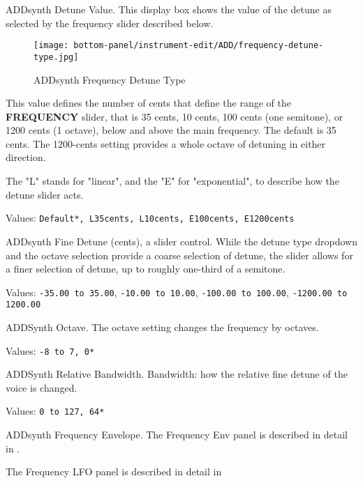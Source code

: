    \setcounter{ItemCounter}{0}      %

   ADDsynth Detune Value.
   This display box shows the value of the detune as selected by the
   frequency slider described below.

\begin{figure}[H]
   \centering
   \texttt{[image: bottom-panel/instrument-edit/ADD/frequency-detune-type.jpg]}
   \caption{ADDsynth Frequency Detune Type}
   \label{fig:addsynth_freq_detune_type}
\end{figure}

   This value defines the number of cents that define the range of the
   \textbf{FREQUENCY} slider, that is 35 cents, 10 cents, 100 cents (one
   semitone), or 1200 cents (1 octave), below and above the main
   frequency.  The default is 35 cents.  The 1200-cents setting provides a
   whole octave of detuning in either direction.

   The "L" stands for "linear", and the "E" for "exponential", to
   describe how the detune slider acts.

   Values: \texttt{Default*, L35cents, L10cents, E100cents, E1200cents}

   ADDsynth Fine Detune (cents), a slider control.
   While the detune type dropdown and the octave selection provide a coarse
   selection of detune, the slider allows for a finer selection of detune,
   up to roughly one-third of a semitone.

   Values:
      \texttt{-35.00 to 35.00},
      \texttt{-10.00 to 10.00},
      \texttt{-100.00 to 100.00},
      \texttt{-1200.00 to 1200.00}

   ADDSynth Octave.
   The octave setting changes the frequency by octaves.

   Values: \texttt{-8 to 7, 0*}

   ADDSynth Relative Bandwidth.
   Bandwidth: how the relative fine detune of the voice is changed.

   Values: \texttt{0 to 127, 64*}

   ADDsynth Frequency Envelope.
   The Frequency Env panel is described in detail in
   .

   The Frequency LFO panel is described in detail in

